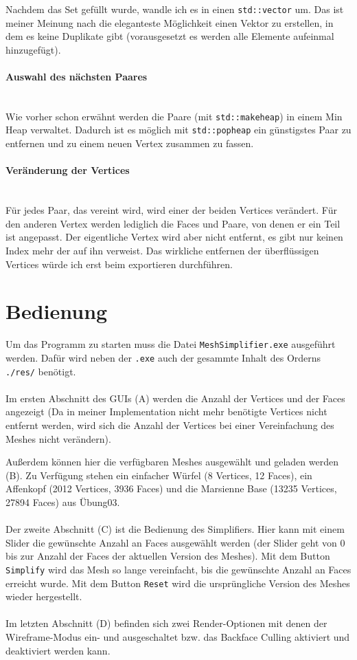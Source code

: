\documentclass[a4paper,12pt]{article}
\newcommand{\myparagraph}[1]{\paragraph*{#1}\mbox{}\\}
\begin{document}
Nachdem das Set gefüllt wurde, wandle ich es in einen \texttt{std::vector} um.
Das ist meiner Meinung nach die eleganteste Möglichkeit einen Vektor zu erstellen, in dem es keine Duplikate gibt (vorausgesetzt es werden alle Elemente aufeinmal hinzugefügt).

\myparagraph{Auswahl des nächsten Paares}
Wie vorher schon erwähnt werden die Paare (mit \texttt{std::make\textunderscore heap}) in einem Min Heap verwaltet. 
Dadurch ist es möglich mit \texttt{std::pop\textunderscore heap} ein günstigstes Paar zu entfernen und zu einem neuen Vertex zusammen zu fassen. 

\myparagraph{Veränderung der Vertices}
Für jedes Paar, das vereint wird, wird einer der beiden Vertices verändert.
Für den anderen Vertex werden lediglich die Faces und Paare, von denen er ein Teil ist angepasst.
Der eigentliche Vertex wird aber nicht entfernt, es gibt nur keinen Index mehr der auf ihn verweist.
Das wirkliche entfernen der überflüssigen Vertices würde ich erst beim exportieren durchführen.

\newpage
\section*{Bedienung}

Um das Programm zu starten muss die Datei \texttt{MeshSimplifier.exe} ausgeführt werden. Dafür wird neben der \texttt{.exe} auch der gesammte Inhalt des Orderns \texttt{./res/} benötigt.
\\
\\
Im ersten Abschnitt des GUIs (A) werden die Anzahl der Vertices und der Faces angezeigt (Da in meiner Implementation nicht mehr benötigte Vertices nicht entfernt werden, wird sich die Anzahl der Vertices bei einer Vereinfachung des Meshes nicht verändern).

Außerdem können hier die verfügbaren Meshes ausgewählt und geladen werden (B). Zu Verfügung stehen ein einfacher Würfel (8 Vertices, 12 Faces), ein Affenkopf (2012 Vertices, 3936 Faces) und die Marsienne Base (13235 Vertices, 27894 Faces) aus Übung03.
\\
\\
Der zweite Abschnitt (C) ist die Bedienung des Simplifiers. Hier kann mit einem Slider die gewünschte Anzahl an Faces ausgewählt werden (der Slider geht von 0 bis zur Anzahl der Faces der aktuellen Version des Meshes). Mit dem Button \texttt{Simplify} wird das Mesh so lange vereinfacht, bis die gewünschte Anzahl an Faces erreicht wurde. Mit dem Button \texttt{Reset} wird die ursprüngliche Version des Meshes wieder hergestellt.
\\
\\
Im letzten Abschnitt (D) befinden sich zwei Render-Optionen mit denen der Wireframe-Modus ein- und ausgeschaltet bzw. das Backface Culling aktiviert und deaktiviert werden kann.
\end{document}
